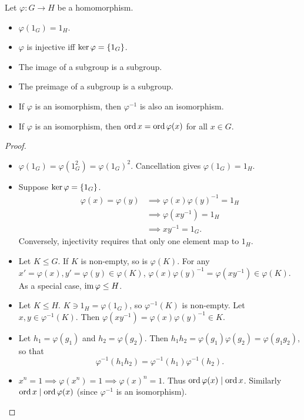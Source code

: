 \begin{exercise}[self]
    Let $\varphi\colon G \to H$ be a homomorphism.
    \begin{itemize}
        \item $\varphi(1_G) = 1_H$.
        \item $\varphi$ is injective iff $\ker \varphi = \{1_G\}$.
        \item The image of a subgroup is a subgroup.
        \item The preimage of a subgroup is a subgroup.
        \item If $\varphi$ is an isomorphism, then $\varphi^{-1}$ is also
            an isomorphism.
        \item If $\varphi$ is an isomorphism,
            then $\operatorname{ord} x = \operatorname{ord} \varphi(x)$ for all $x \in G$.
    \end{itemize}
\end{exercise}
\begin{proof} \leavevmode
    \begin{itemize}
        \item $\varphi(1_G) = \varphi(1_G^2) = \varphi(1_G)^2$.
            Cancellation gives $\varphi(1_G) = 1_H$.
        \item Suppose $\ker \varphi = \{1_G\}$.
        \begin{align*}
            \varphi(x) = \varphi(y)
                &\implies \varphi(x)\varphi(y)^{-1} = 1_H \\
                &\implies \varphi(xy^{-1}) = 1_H \\
                &\implies xy^{-1} = 1_G.
        \end{align*}
        Conversely, injectivity requires that only one element map to $1_H$.
        \item Let $K \le G$.
        If $K$ is non-empty, so is $\varphi(K)$.
        For any $x' = \varphi(x), y' = \varphi(y) \in \varphi(K)$,
        $\varphi(x)\varphi(y)^{-1} = \varphi(xy^{-1}) \in \varphi(K)$.
        As a special case, $\operatorname{im} \varphi \le H$.
        \item Let $K \le H$.
        $K \ni 1_H = \varphi(1_G)$, so $\varphi^{-1}(K)$ is non-empty.
        Let $x, y \in \varphi^{-1}(K)$.
        Then $\varphi(xy^{-1}) = \varphi(x)\varphi(y)^{-1} \in K$.
        \item Let $h_1 = \varphi(g_1)$ and $h_2 = \varphi(g_2)$.
        Then $h_1h_2 = \varphi(g_1)\varphi(g_2) = \varphi(g_1g_2)$,
        so that \[
            \varphi^{-1}(h_1h_2) = \varphi^{-1}(h_1) \varphi^{-1}(h_2).
        \]
        \item $x^n = 1 \implies \varphi(x^n) = 1 \implies \varphi(x)^n = 1$.
        Thus $\operatorname{ord} \varphi(x) \mid \operatorname{ord} x$.
        Similarly $\operatorname{ord} x \mid \operatorname{ord} \varphi(x)$
        (since $\varphi^{-1}$ is an isomorphism). \qedhere
    \end{itemize}
\end{proof}

